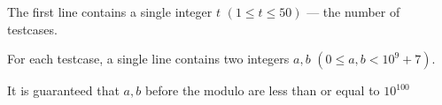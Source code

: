The first line contains a single integer $t$ $(1 \leq t \leq 50)$ --- the number of testcases.

For each testcase, a single line contains two integers $a, b$ $(0 \leq a, b < 10^9 + 7)$.

It is guaranteed that $a,b$ before the modulo are less than or equal to $10^{100}$